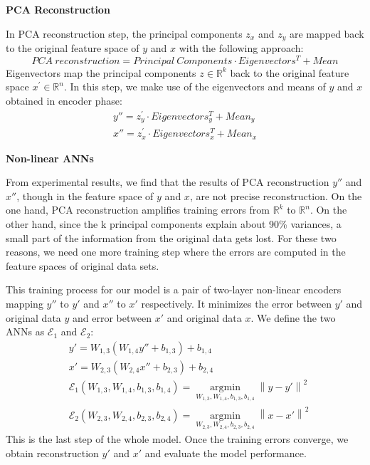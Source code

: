 \documentclass[12pt]{report} %
\newcommand{\norm}[1]{\left\lVert #1 \right\rVert}
\begin{document}
\textbf{PCA Reconstruction}

In PCA reconstruction step, the principal components $z_x$ and $z_y$ are mapped back to the original feature space of $y$ and $x$ with the following approach:
\begin{equation}
PCA\ reconstruction=Principal\ Components \cdot Eigenvectors^T + Mean
\end{equation}
Eigenvectors map the principal components $z\in \mathbb{R}^{k}$ back to the original feature space $x^{'}\in \mathbb{R}^{n}$. In this step, we make use of the eigenvectors and means of $y$ and $x$ obtained in encoder phase:
\begin{equation}
\begin{split}
y''= z_y^{'}\cdot Eigenvectors_{y}^T + Mean_y \\
x''= z_x^{'}\cdot Eigenvectors_{x}^T + Mean_x
\end{split}
\end{equation}

\textbf{Non-linear ANNs}

From experimental results, we find that the results of PCA reconstruction $y''$ and $x''$, though in the feature space of $y$ and $x$, are not precise reconstruction. On the one hand, PCA reconstruction amplifies training errors from $\mathbb{R}^{k}$ to $\mathbb{R}^{n}$. On the other hand, since the k principal components explain about 90\% variances, a small part of the information from the original data gets lost. For these two reasons, we need one more training step where the errors are computed in the feature spaces of original data sets.

This training process for our model is a pair of two-layer non-linear encoders mapping $y''$ to $y'$ and $x''$ to $x'$ respectively. It minimizes the error between $y'$ and original data $y$ and error between $x'$ and original data $x$. We define the two ANNs as $\mathcal{E}_1$ and $\mathcal{E}_2$:
\begin{equation}
\begin{split}
&y'=W_{1,3}(W_{1,4}y''+b_{1,3})+b_{1,4} \\
&x'=W_{2,3}(W_{2,4}x''+b_{2,3})+b_{2,4} \\
&\mathcal{E}_1(W_{1,3},W_{1,4},b_{1,3},b_{1,4})=\operatorname*{argmin}_{W_{1,3},W_{1,4},b_{1,3},b_{1,4}}\norm{y-y'}^2 \\
&\mathcal{E}_2(W_{2,3},W_{2,4},b_{2,3},b_{2,4})=\operatorname*{argmin}_{W_{2,3},W_{2,4},b_{2,3},b_{2,4}}\norm{x-x'}^2
\end{split}
\end{equation}
This is the last step of the whole model. Once the training errors converge, we obtain reconstruction $y'$ and $x'$ and evaluate the model performance.
\end{document}
